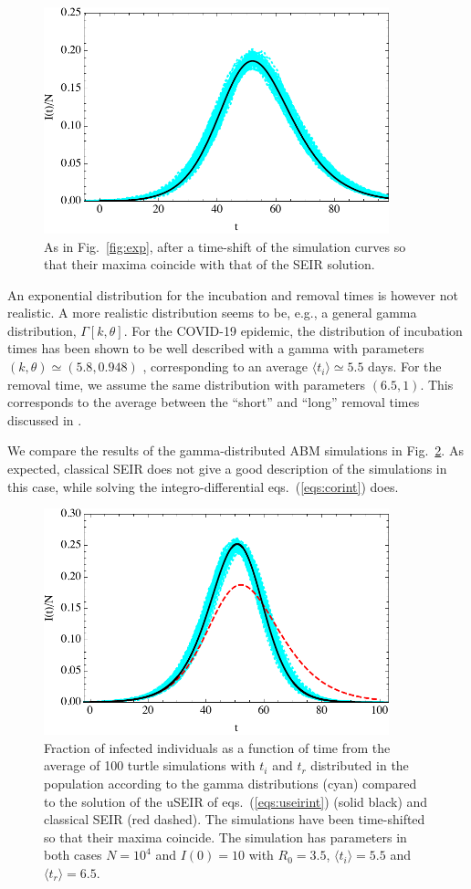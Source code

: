 \documentclass[a4paper,oneside,11pt]{article}
\begin{document}
   \begin{figure}[h!]
  \centering
  \includegraphics[width=10cm]{expshift.pdf}
  \caption{ As in Fig.~\ref{fig:exp}, after a time-shift of the simulation curves so that their maxima coincide with that of the SEIR solution.  }
  \label{fig:expshift}
   \end{figure}

 An exponential distribution for the incubation and removal times is however not realistic. A more realistic distribution seems to be, e.g., a general gamma distribution, $\Gamma[k,\theta]$. 
For the COVID-19 epidemic, the distribution of incubation times has been shown to be well described with a gamma with parameters $(k,\theta) \simeq (5.8, 0.948)$ \cite{Hellewell2020}, corresponding to an average $\langle t_i\rangle \simeq 5.5$ days. For the removal time, we assume the same distribution with parameters $(6.5,1)$. This corresponds to the average between the ``short'' and ``long'' removal times discussed in \cite{Hellewell2020}.

We compare the results of the gamma-distributed ABM simulations in Fig.~\ref{fig:expvsgamma}. As expected, classical SEIR does not give a good description of the simulations in this case, while solving the integro-differential eqs.~(\ref{eqs:corint}) does. 
\begin{figure}[h!]
  \centering
  \includegraphics[width=10cm]{GGvsSEIRshift.pdf}
  \caption{ Fraction of infected individuals as a function of time from the average of 100 turtle simulations with $t_i$ and $t_r$ distributed in the population according to the gamma distributions (cyan) compared to the solution of the uSEIR of eqs.~(\ref{eqs:useirint}) (solid black) and classical SEIR (red dashed). The simulations have been time-shifted so that their maxima coincide. The simulation has parameters in both cases $N=10^4$ and $I(0)=10$ with $R_0=3.5$, $\langle t_i\rangle=5.5$ and $\langle t_r\rangle=6.5$.  }
  \label{fig:expvsgamma}
   \end{figure}
   
\end{document}
